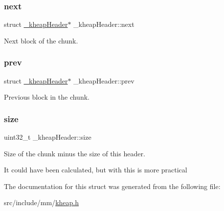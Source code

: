 \subsubsection{\texorpdfstring{next}{next}}
{\footnotesize\ttfamily struct \hyperlink{struct__kheapHeader}{\+\_\+kheap\+Header}$\ast$ \+\_\+kheap\+Header\+::next}



Next block of the chunk. 

\mbox{\label{struct__kheapHeader_a6755f9f330cfee6083f4f330af129608}} 
\subsubsection{\texorpdfstring{prev}{prev}}
{\footnotesize\ttfamily struct \hyperlink{struct__kheapHeader}{\+\_\+kheap\+Header}$\ast$ \+\_\+kheap\+Header\+::prev}



Previous block in the chunk. 

\mbox{\label{struct__kheapHeader_aee2f50280223d62d19e3941897d08d23}} 
\subsubsection{\texorpdfstring{size}{size}}
{\footnotesize\ttfamily uint32\+\_\+t \+\_\+kheap\+Header\+::size}



Size of the chunk minus the size of this header. 

It could have been calculated, but with this is more practical 

The documentation for this struct was generated from the following file\+:\begin{DoxyCompactItemize}
\item 
src/include/mm/\hyperlink{kheap_8h}{kheap.\+h}\end{DoxyCompactItemize}
